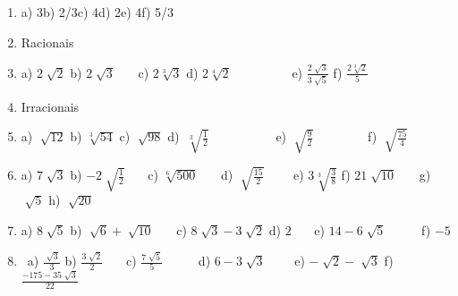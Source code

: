 \documentclass[12pt]{article}
\renewcommand{\_}{\kern-1.5pt\textunderscore\kern-1.5pt}
\begin{document}
\vspace{\baselineskip}
\setlength{\parskip}{9.96pt}
\begin{enumerate}
	\item a) 3\tab b) 2/3\tab \tab c) 4\tab d) 2\tab e) 4\tab f) 5/3\par

	\item  Racionais\par

	\item a)  \( 2\sqrt[]{2} \) \tab b)  \( 2\sqrt[]{3} \) \ \ \  \tab c)  \( 2\sqrt[3]{3} \) \tab \tab d)  \( 2\sqrt[4]{2} \) \ \ \ \ \ \ \ \ \  e)  \( \frac{2\sqrt[]{3}}{3\sqrt[]{5}} \) \tab \tab f)  \( \frac{2\sqrt[3]{2}}{5} \) \par

	\item  Irracionais \par

	\item  a)  \( \sqrt[]{12} \) \tab b)  \( \sqrt[3]{54} \) \tab \tab c)  \( \sqrt[]{98} \) \tab \tab d) \( ~\sqrt[3]{\frac{1}{2}} \) \ \ \ \ \ \ \ \ \ \  e)  \( \sqrt[]{\frac{9}{2}} \) \ \ \ \ \ \ \ \  f)  \( \sqrt[]{\frac{75}{4}} \) \par

	\item a)  \( 7\sqrt[]{3} \) \tab b)  \( -2\sqrt[]{\frac{1}{2}} \)  \  \ \  c)  \( \sqrt[6]{500} \) \tab \ \ \  d)  \( \sqrt[]{\frac{15}{2}} \) \ \ \ \  e)  \( 3\sqrt[3]{\frac{3}{8}} \) \tab f)  \( 21\sqrt[]{10} \) \ \ \  g)  \( \sqrt[]{5} \) \tab h)  \( \sqrt[]{20} \) \par

	\item  a)  \( 8\sqrt[]{5} \) \tab b)  \( \sqrt[]{6}+\sqrt[]{10} \) \ \ \   c)  \( 8\sqrt[]{3}-3\sqrt[]{2} \) \tab d)  \( 2 \) \ \ \  \tab  e)  \( 14-6\sqrt[]{5} \) \tab \ \ \ \ \  f)  \( -5 \) \par


\vspace{\baselineskip}
\setlength{\parskip}{8.04pt}
\setlength{\parskip}{9.96pt}
	\item \  a)  \( \frac{\sqrt[]{3}}{3} \) \tab b)  \( \frac{3\sqrt[]{2}}{2} \) \ \  \  c)  \( \frac{7\sqrt[]{5}}{5} \) \ \ \ \ \  d)  \( 6-3\sqrt[]{3} \) \ \ \ \  e)  \( -\sqrt[]{2}-\sqrt[]{3} \) \tab f)  \( \frac{-175-35\sqrt[]{3}}{22} \) 
\end{enumerate}\par
\end{document}
